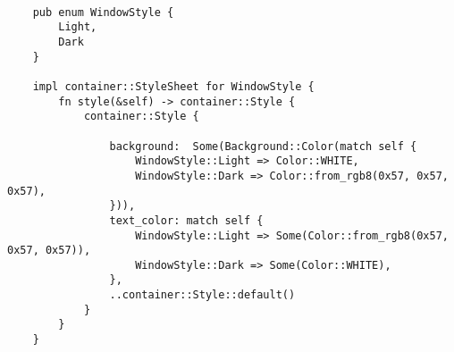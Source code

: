 \begin{lstlisting}
  
    pub enum WindowStyle {
        Light,
        Dark
    }

    impl container::StyleSheet for WindowStyle {
        fn style(&self) -> container::Style {
            container::Style { 
                
                background:  Some(Background::Color(match self {
                    WindowStyle::Light => Color::WHITE,
                    WindowStyle::Dark => Color::from_rgb8(0x57, 0x57, 0x57),
                })),
                text_color: match self {
                    WindowStyle::Light => Some(Color::from_rgb8(0x57, 0x57, 0x57)),
                    WindowStyle::Dark => Some(Color::WHITE),
                },
                ..container::Style::default()
            }
        }
    }

\end{lstlisting}

